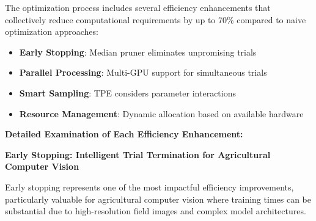 The optimization process includes several efficiency enhancements that collectively reduce computational requirements by up to 70\% compared to naive optimization approaches:

\begin{itemize}
    \item \textbf{Early Stopping}: Median pruner eliminates unpromising trials
    \item \textbf{Parallel Processing}: Multi-GPU support for simultaneous trials
    \item \textbf{Smart Sampling}: TPE considers parameter interactions
    \item \textbf{Resource Management}: Dynamic allocation based on available hardware
\end{itemize}

\textbf{Detailed Examination of Each Efficiency Enhancement:}

\textbf{Early Stopping: Intelligent Trial Termination for Agricultural Computer Vision}

Early stopping represents one of the most impactful efficiency improvements, particularly valuable for agricultural computer vision where training times can be substantial due to high-resolution field images and complex model architectures.

